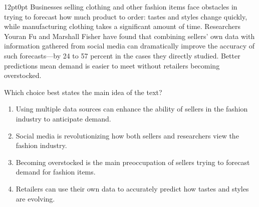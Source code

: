 \documentclass[11pt, twocolumn]{article}
\newcounter{questionnum}
\begin{document}
\vspace{6pt}\noindent
\begin{minipage}{\columnwidth}\raggedright
\noindent{}\par\vspace{8pt}
\begin{adjustwidth}{12pt}{0pt}
Businesses selling clothing and other fashion items face obstacles in trying to forecast how much product to order: tastes and styles change quickly, while manufacturing clothing takes a significant amount of time. Researchers Youran Fu and Marshall Fisher have found that combining sellers' own data with information gathered from social media can dramatically improve the accuracy of such forecasts---by 24 to 57 percent in the cases they directly studied. Better predictions mean demand is easier to meet without retailers becoming overstocked.
\vspace{6pt}

Which choice best states the main idea of the text?
\begin{enumerate}[label=\Alph*),leftmargin=18pt,topsep=3pt,itemsep=2pt]
  \item Using multiple data sources can enhance the ability of sellers in the fashion industry to anticipate demand.
  \item Social media is revolutionizing how both sellers and researchers view the fashion industry.
  \item Becoming overstocked is the main preoccupation of sellers trying to forecast demand for fashion items.
  \item Retailers can use their own data to accurately predict how tastes and styles are evolving.
\end{enumerate}
\end{adjustwidth}
\end{minipage}\par
\end{document}
